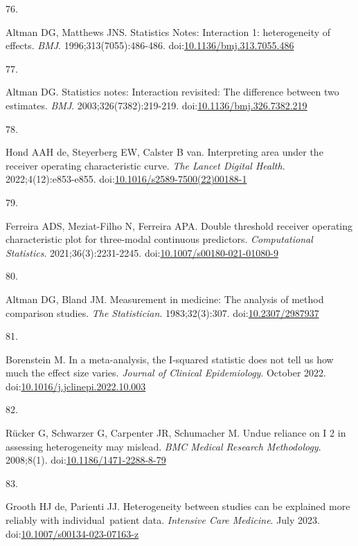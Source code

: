 \documentclass[
]{book}
\newlength{\cslhangindent}
\newlength{\csllabelwidth}
\newlength{\cslentryspacingunit} %
\newenvironment{CSLReferences}[2] %
 {%
  \setlength{\parindent}{0pt}
  \ifodd #1
  \let\oldpar\par
  \def\par{\hangindent=\cslhangindent\oldpar}
  \fi
  \setlength{\parskip}{#2\cslentryspacingunit}
 }%
 {}
\newcommand{\CSLLeftMargin}[1]{\parbox[t]{\csllabelwidth}{#1}}
\newcommand{\CSLRightInline}[1]{\parbox[t]{\linewidth - \csllabelwidth}{#1}\break}
\begin{document}
\begin{CSLReferences}{0}{0}
\leavevmode{}%
\CSLLeftMargin{76. }%
\CSLRightInline{Altman DG, Matthews JNS. Statistics Notes: Interaction 1: heterogeneity of effects. \emph{BMJ}. 1996;313(7055):486-486. doi:\href{https://doi.org/10.1136/bmj.313.7055.486}{10.1136/bmj.313.7055.486}}

\leavevmode{}%
\CSLLeftMargin{77. }%
\CSLRightInline{Altman DG. Statistics notes: Interaction revisited: The difference between two estimates. \emph{BMJ}. 2003;326(7382):219-219. doi:\href{https://doi.org/10.1136/bmj.326.7382.219}{10.1136/bmj.326.7382.219}}

\leavevmode{}%
\CSLLeftMargin{78. }%
\CSLRightInline{Hond AAH de, Steyerberg EW, Calster B van. Interpreting area under the receiver operating characteristic curve. \emph{The Lancet Digital Health}. 2022;4(12):e853-e855. doi:\href{https://doi.org/10.1016/s2589-7500(22)00188-1}{10.1016/s2589-7500(22)00188-1}}

\leavevmode{}%
\CSLLeftMargin{79. }%
\CSLRightInline{Ferreira ADS, Meziat-Filho N, Ferreira APA. Double threshold receiver operating characteristic plot for three-modal continuous predictors. \emph{Computational Statistics}. 2021;36(3):2231-2245. doi:\href{https://doi.org/10.1007/s00180-021-01080-9}{10.1007/s00180-021-01080-9}}

\leavevmode{}%
\CSLLeftMargin{80. }%
\CSLRightInline{Altman DG, Bland JM. Measurement in medicine: The analysis of method comparison studies. \emph{The Statistician}. 1983;32(3):307. doi:\href{https://doi.org/10.2307/2987937}{10.2307/2987937}}

\leavevmode{}%
\CSLLeftMargin{81. }%
\CSLRightInline{Borenstein M. In a meta-analysis, the I-squared statistic does not tell us how much the effect size varies. \emph{Journal of Clinical Epidemiology}. October 2022. doi:\href{https://doi.org/10.1016/j.jclinepi.2022.10.003}{10.1016/j.jclinepi.2022.10.003}}

\leavevmode{}%
\CSLLeftMargin{82. }%
\CSLRightInline{Rücker G, Schwarzer G, Carpenter JR, Schumacher M. Undue reliance on I 2 in assessing heterogeneity may mislead. \emph{BMC Medical Research Methodology}. 2008;8(1). doi:\href{https://doi.org/10.1186/1471-2288-8-79}{10.1186/1471-2288-8-79}}

\leavevmode{}%
\CSLLeftMargin{83. }%
\CSLRightInline{Grooth HJ de, Parienti JJ. Heterogeneity between studies can be explained more reliably with individual~patient data. \emph{Intensive Care Medicine}. July 2023. doi:\href{https://doi.org/10.1007/s00134-023-07163-z}{10.1007/s00134-023-07163-z}}


\end{CSLReferences}
\end{document}
